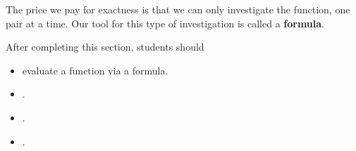 \documentclass{ximera}
\begin{document}
The price we pay for exactness is that we can only investigate the function, one pair at a time.  Our tool for this type of investigation is called a \textbf{formula}.































\begin{sectionOutcomes}
After completing this section, students should 

\begin{itemize}
\item evaluate a function via a formula.
\item .
\item .
\item .
\end{itemize}
\end{sectionOutcomes}
\end{document}
